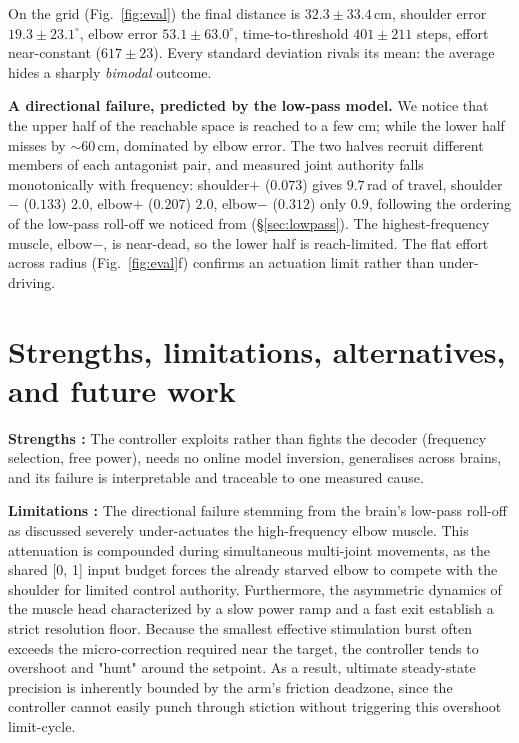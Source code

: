 \documentclass[11pt]{article}
\begin{document}
On the grid (Fig.~\ref{fig:eval}) the final distance is
$32.3\pm33.4$\,cm, shoulder error $19.3\pm23.1^\circ$, elbow error
$53.1\pm63.0^\circ$, time-to-threshold $401\pm211$ steps, effort near-constant
($617\pm23$). Every standard deviation rivals its mean: the average hides a sharply
\emph{bimodal} outcome.

\textbf{A directional failure, predicted by the low-pass model.}
We notice that the upper half of the reachable space is reached to a few cm; while the 
lower half misses by $\sim$60\,cm, dominated by elbow error. The two halves recruit 
different members of each antagonist pair, and measured joint authority falls monotonically 
with frequency: shoulder$+$ ($0.073$) gives $9.7$\,rad of travel, shoulder$-$ ($0.133$) $2.0$, elbow$+$ ($0.207$)
$2.0$, elbow$-$ ($0.312$) only $0.9$, following the ordering of the low-pass roll-off we noticed from
(\S\ref{sec:lowpass}). The highest-frequency muscle, elbow$-$, is near-dead, so the
lower half is reach-limited. The flat effort across radius (Fig.~\ref{fig:eval}f)
confirms an actuation limit rather than under-driving.

\section{Strengths, limitations, alternatives, and future work}
\textbf{Strengths :} The controller exploits rather than fights the decoder (frequency
selection, free power), needs no online model inversion, generalises across brains, and
its failure is interpretable and traceable to one measured cause.

\textbf{Limitations :} The directional failure stemming from the brain's low-pass roll-off as discussed severely under-actuates the high-frequency elbow muscle.
 This attenuation is compounded during simultaneous multi-joint movements, as the shared [0, 1] input budget forces the already starved elbow to compete with the 
 shoulder for limited control authority. Furthermore, the asymmetric dynamics of the muscle head characterized by a slow power ramp and a fast exit establish a 
 strict resolution floor. Because the smallest effective stimulation burst often exceeds the micro-correction required near the target, the controller tends to overshoot and "hunt" around the setpoint.
  As a result, ultimate steady-state precision is inherently bounded by the arm's friction deadzone, since the controller cannot easily punch through stiction without triggering this overshoot limit-cycle. 
  
\end{document}
